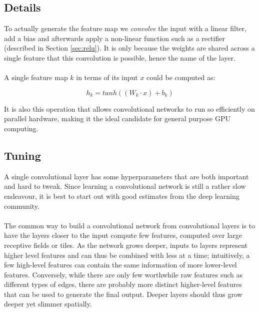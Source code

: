 \subsection{Details}
\label{sub:details}
To actually generate the feature map
we \textit{convolve} the input with a linear filter,
add a bias and afterwards apply a non-linear function
such as a rectifier
(described in Section \ref{sec:relu}).
It is only because the weights are shared across a single feature
that this convolution is possible,
hence the name of the layer.

\paragraph{}
A single feature map $k$ in terms of its input $x$ could be computed as:

\begin{equation}
  h_k = tanh((W_k \cdot x) + b_k)
\end{equation}

It is also this operation that allows convolutional networks
to run so efficiently on parallel hardware,
making it the ideal candidate
for general purpose GPU computing.

\subsection{Tuning}
A single convolutional layer
has some hyperparameters that are both important
and hard to tweak.
Since learning a convolutional network
is still a rather slow endeavour,
it is best to start out with good estimates from the deep learning community.

\paragraph{}
The common way to build a convolutional network
from convolutional layers is to have
the layers closer to the input compute
few features,
computed over large receptive fields or tiles.
As the network grows deeper,
inputs to layers represent higher level features
and can thus be combined with less at a time;
intuitively, a few high-level features
can contain the same information of more
lower-level features.
Conversely, while there are only few
worthwhile raw features such as different types of edges,
there are probably more distinct higher-level features
that can be used to generate the final output.
Deeper layers should thus grow deeper yet slimmer spatially.

